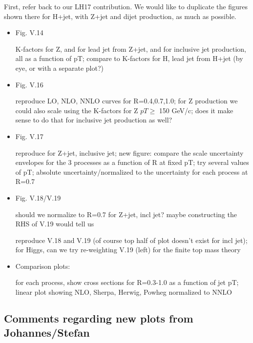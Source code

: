 \documentclass[aps,prd,onecolumn,fleqn,superscriptaddress,groupedaddress,nofootinbib,preprintnumbers,nobalancelastpage]{revtex4}
\begin{document}
First, refer back to our LH17 contribution. We would like to duplicate the figures shown there for H+jet, with Z+jet and dijet production, as much as possible. 

\begin{itemize}
\item 

Fig. V.14

K-factors for Z,  and for lead jet from Z+jet, and for inclusive jet production, all as a function of pT; compare to K-factors for H, lead jet from H+jet (by eye, or with a separate plot?)

\item
Fig. V.16

reproduce LO, NLO, NNLO curves for R=0.4,0.7,1.0; for Z production we could also scale using the K-factors for Z $pT \ge $ 150 GeV/c; does it make sense to do that for inclusive jet production as well? 

\item
Fig. V.17

reproduce for Z+jet, inclusive jet; new figure: compare the scale uncertainty envelopes for the 3 processes as a function of R at fixed pT; try several values of pT;  absolute uncertainty/normalized to the uncertainty for each process at R=0.7

\item

Fig. V.18/V.19

should we normalize to R=0.7 for Z+jet, incl jet? maybe constructing the RHS of V.19 would tell us

reproduce V.18 and V.19 (of course top half of plot doesn't exist for incl jet); for Higgs, can we try re-weighting V.19 (left) for the finite top mass theory

\item
Comparison plots:

for each process, show cross sections for R=0.3-1.0 as a function of jet pT; linear plot showing NLO, Sherpa, Herwig, Powheg normalized to NNLO



\end{itemize}

\subsection{Comments regarding new plots from Johannes/Stefan}
\end{document}
